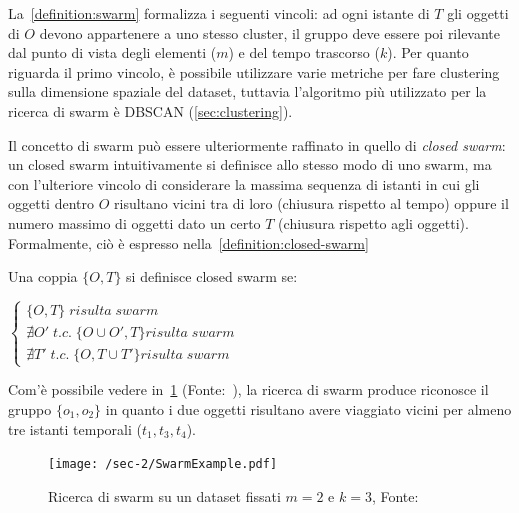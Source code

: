 La~\cref{definition:swarm} formalizza i seguenti vincoli:
ad ogni istante di \(T\) gli oggetti di \(O\) devono appartenere a uno stesso cluster,
il gruppo deve essere poi rilevante dal punto di vista degli elementi (\(m\)) e del tempo trascorso
(\(k\)).
Per quanto riguarda il primo vincolo, è possibile utilizzare varie metriche per fare clustering
sulla dimensione spaziale del dataset, tuttavia l'algoritmo più utilizzato per la ricerca di swarm
è DBSCAN (\cref{sec:clustering}).


Il concetto di swarm può essere ulteriormente raffinato in quello di \textit{closed swarm}:
un closed swarm intuitivamente si definisce allo stesso modo di uno swarm, ma con l'ulteriore
vincolo di considerare la massima sequenza di istanti in cui gli oggetti dentro \(O\) risultano vicini
tra di loro (chiusura rispetto al tempo) oppure il numero massimo di oggetti dato un certo \(T\) (chiusura rispetto agli oggetti).
Formalmente, ciò è espresso nella~\cref{definition:closed-swarm}

\begin{definition}\label{definition:closed-swarm}

  Una coppia \( \{ O, T \} \) si definisce closed swarm se:

  \begin{center}

    \(
      \begin{cases}
         \{ O, T \} \; risulta \; swarm   \\
         \nexists O' \; t.c. \;  \{ O \cup O', T \} risulta \; swarm   \\
         \nexists T' \; t.c. \;  \{ O, T \cup T' \} risulta \; swarm
      \end{cases}
    \)

  \end{center}

\end{definition}

Com'è possibile vedere in~\cref{fig:chap-1:SwarmExample} (Fonte:~\cite{phan2016all}), la ricerca di swarm produce riconosce
il gruppo \( \{ o_{1}, o_{2}\} \) in quanto i due oggetti risultano avere viaggiato vicini per almeno
tre istanti temporali (\(t_{1}, t_{3}, t_{4}\)).

\begin{figure}
  \centering
  \texttt{[image: /sec-2/SwarmExample.pdf]}
  \caption{Ricerca di swarm su un dataset fissati \(m=2\) e \(k=3\), Fonte:\cite{DBLP:journals/ijitdm/PhanPT16}}%
  \label{fig:chap-1:SwarmExample}
\end{figure}


